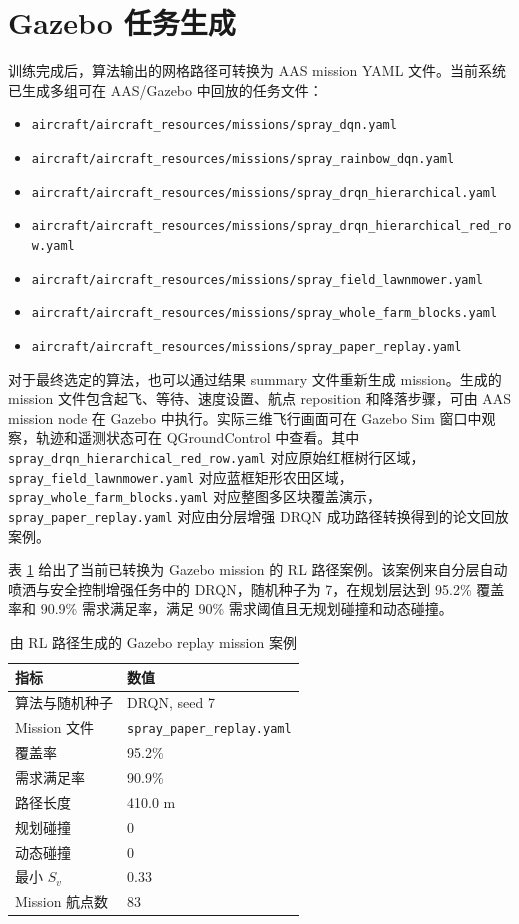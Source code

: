 \documentclass[UTF8]{ctexart}
\begin{document}
\section{Gazebo 任务生成}

训练完成后，算法输出的网格路径可转换为 AAS mission YAML 文件。当前系统已生成多组可在 AAS/Gazebo 中回放的任务文件：
\begin{itemize}
  \item \texttt{aircraft/aircraft\_resources/missions/spray\_dqn.yaml}
  \item \texttt{aircraft/aircraft\_resources/missions/spray\_rainbow\_dqn.yaml}
  \item \texttt{aircraft/aircraft\_resources/missions/spray\_drqn\_hierarchical.yaml}
  \item \texttt{aircraft/aircraft\_resources/missions/spray\_drqn\_hierarchical\_red\_row.yaml}
  \item \texttt{aircraft/aircraft\_resources/missions/spray\_field\_lawnmower.yaml}
  \item \texttt{aircraft/aircraft\_resources/missions/spray\_whole\_farm\_blocks.yaml}
  \item \texttt{aircraft/aircraft\_resources/missions/spray\_paper\_replay.yaml}
\end{itemize}

对于最终选定的算法，也可以通过结果 summary 文件重新生成 mission。生成的 mission 文件包含起飞、等待、速度设置、航点 reposition 和降落步骤，可由 AAS mission node 在 Gazebo 中执行。实际三维飞行画面可在 Gazebo Sim 窗口中观察，轨迹和遥测状态可在 QGroundControl 中查看。其中 \texttt{spray\_drqn\_hierarchical\_red\_row.yaml} 对应原始红框树行区域，\texttt{spray\_field\_lawnmower.yaml} 对应蓝框矩形农田区域，\texttt{spray\_whole\_farm\_blocks.yaml} 对应整图多区块覆盖演示，\texttt{spray\_paper\_replay.yaml} 对应由分层增强 DRQN 成功路径转换得到的论文回放案例。

表 \ref{tab:gazebo_replay_case} 给出了当前已转换为 Gazebo mission 的 RL 路径案例。该案例来自分层自动喷洒与安全控制增强任务中的 DRQN，随机种子为 7，在规划层达到 95.2\% 覆盖率和 90.9\% 需求满足率，满足 90\% 需求阈值且无规划碰撞和动态碰撞。

\begin{table}[H]
\centering
\caption{由 RL 路径生成的 Gazebo replay mission 案例}
\label{tab:gazebo_replay_case}
\begin{tabular}{ll}
\toprule
指标 & 数值 \\
\midrule
算法与随机种子 & DRQN, seed 7 \\
Mission 文件 & \texttt{spray\_paper\_replay.yaml} \\
覆盖率 & 95.2\% \\
需求满足率 & 90.9\% \\
路径长度 & 410.0 m \\
规划碰撞 & 0 \\
动态碰撞 & 0 \\
最小 $S_v$ & 0.33 \\
Mission 航点数 & 83 \\
\bottomrule
\end{tabular}
\end{table}
\end{document}
